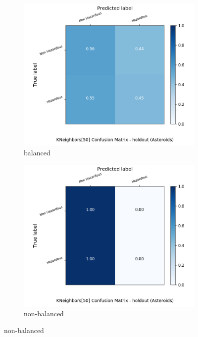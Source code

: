 \begin{figure}[H]
	\centering
	\begin{subfigure}{.5\textwidth}
		\centering
		\includegraphics[width=1.1\textwidth]{Plots/asteroids/asteroids_KNeighbors_50_balance_True_holdout.png}
		\caption{balanced}
	\end{subfigure}%
	\begin{subfigure}{.5\textwidth}
		\centering
		\includegraphics[width=1.1\textwidth]{Plots/asteroids/asteroids_KNeighbors_50_balance_False_holdout.png}
		\caption{non-balanced}
	\end{subfigure}
\end{figure}

